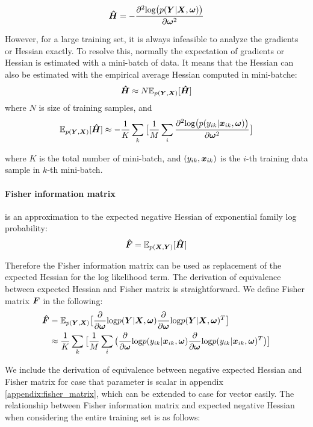 \[
\boldsymbol{\hat{H}} = -\frac{\partial^2\text{log}\big(p(\boldsymbol Y|\boldsymbol X, \boldsymbol \omega)\big)}{\partial \boldsymbol \omega^2}
\] 

However, for a large training set, it is always infeasible to analyze the gradients or Hessian exactly. To resolve this, normally the expectation of gradients or Hessian is estimated with a mini-batch of data. It means that the Hessian can also be estimated with the empirical average Hessian computed in mini-batche:
\[
\boldsymbol{\hat H} \approx N\mathbb E_{p(\boldsymbol Y, \boldsymbol X)}[\boldsymbol{\hat{H}}]
\]
where $N$ is size of training samples, and 
\begin{equation} \label{expected hessian}
\mathbb E_{p(\boldsymbol Y, \boldsymbol X)}[\boldsymbol{\hat{H}}] \approx -\frac{1}{K}\sum_{k}\big[\frac{1}{M}\sum_{i}\frac{\partial^2\text{log}\big(p(y_{ik}|\boldsymbol x_{ik}, \boldsymbol \omega)\big)}{\partial \boldsymbol \omega^2}\big]
\end{equation}

where $K$ is the total number of mini-batch, and $(y_{ik}, \boldsymbol x_{ik})$ is the $i$-th training data sample in $k$-th mini-batch. 

\paragraph{Fisher information matrix} is an approximation to the expected negative Hessian of exponential family log probability:
\[
\boldsymbol{\hat{F}} = \mathbb E_{p(\boldsymbol X, \boldsymbol Y)}[\boldsymbol{\hat{H}}]
\]

Therefore the Fisher information matrix can be used as replacement of the expected Hessian for the log likelihood term. The derivation of equivalence between expected Hessian and Fisher matrix is straightforward. We define Fisher matrix $\boldsymbol F$ in the following:
\begin{equation}
\begin{aligned}\label{Fisher}
\boldsymbol{\hat{F}} &= \mathbb E_{p(\boldsymbol Y, \boldsymbol X)}\big[\frac{\partial}{\partial \boldsymbol \omega}\text{log}p(\boldsymbol Y|\boldsymbol X,\boldsymbol \omega)\frac{\partial}{\partial \boldsymbol \omega}\text{log}p(\boldsymbol Y|\boldsymbol X,\boldsymbol \omega)^T\big] \\
&\approx \frac{1}{K}\sum_{k}\big[\frac{1}{M}\sum_{i}
\big(\frac{\partial}{\partial \boldsymbol \omega}\text{log}p(y_{ik}|\boldsymbol x_{ik},\boldsymbol \omega)\frac{\partial}{\partial \boldsymbol \omega}\text{log}p(y_{ik}|\boldsymbol x_{ik},\boldsymbol \omega)^T\big)\big]
\end{aligned}
\end{equation}

We include the derivation of equivalence between negative expected Hessian and Fisher matrix for case that parameter is scalar in appendix \ref{appendix:fisher_matrix}, which can be extended to case for vector easily.
The relationship between Fisher information matrix and expected negative Hessian when considering the entire training set is as follows: 

